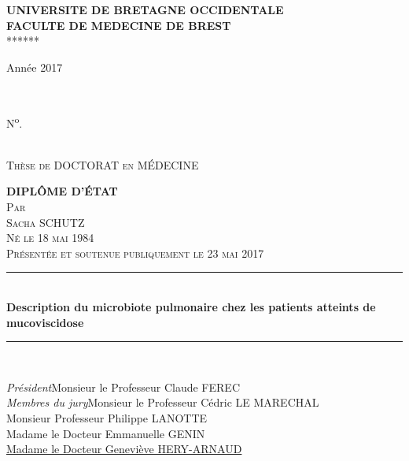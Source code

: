 \documentclass[12pt,a4paper]{article}
\newcommand{\HRule}{\rule{\linewidth}{0.5mm}} %
\begin{document}
\begin{titlepage}
\centering
\Large \textbf{UNIVERSITE DE BRETAGNE OCCIDENTALE \\
FACULTE DE MEDECINE DE BREST}\\
******


\begin{minipage}{0.4\textwidth}
 \begin{flushleft} \large
     Année 2017
 \end{flushleft}
\end{minipage}
~
\begin{minipage}{0.5\textwidth}
 \begin{flushright} \large
    N\textsuperscript{o}.
 \end{flushright}
\end{minipage}\\[0.2cm]
\center
\textsc{\large Thèse de DOCTORAT en MÉDECINE }


\textsc{\Large \textbf{DIPLÔME D'ÉTAT}}\\[0.1cm]
\textsc{\large Par}\\[0.1cm]
\textsc{\Large Sacha SCHUTZ} \\[0.1cm]
\textsc{\normalsize Né le 18 mai 1984} \\[0.1cm]
\textsc{\normalsize Présentée et soutenue publiquement le 23 mai 2017}\\[1.0cm]


\HRule \\[0.5cm]

{ \huge \bfseries Description du microbiote pulmonaire chez les patients atteints de mucoviscidose}\\[0.4cm]

\HRule \\[3.5cm]

 \begin{flushleft} \large
      \hspace{1,5cm}\emph{Président}\hspace{2.89cm}Monsieur le Professeur Claude FEREC\\[0.4cm]
      \hspace{1,5cm}\emph{Membres du jury}\hspace{1.3cm}Monsieur le Professeur Cédric LE MARECHAL\\
       \hspace{1,5cm}\hspace*{5cm}Monsieur Professeur Philippe LANOTTE\\
       \hspace{1,5cm}\hspace*{5cm}Madame le Docteur Emmanuelle GENIN\\
       \hspace{1,5cm}\hspace*{5cm}\underline{Madame le Docteur Geneviève HERY-ARNAUD} \\
\end{flushleft}


\vfill %
\restoregeometry
\end{titlepage}
\end{document}
